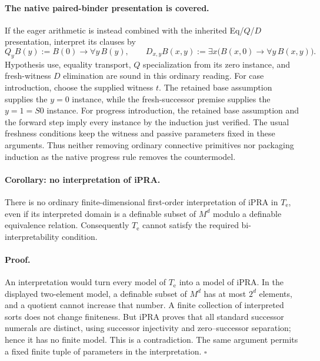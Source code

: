 \paragraph{The native paired-binder presentation is covered.}
If the eager arithmetic is instead combined with the inherited
Eq/$Q$/$D$ presentation, interpret its clauses by
\[
 Q_yB(y):=B(0)\to\forall y\,B(y),\qquad
 D_{x,y}B(x,y):=\exists x\bigl(B(x,0)\to\forall y\,B(x,y)\bigr).
\]
Hypothesis use, equality transport, $Q$ specialization from its zero
instance, and fresh-witness $D$ elimination are sound in this ordinary
reading.  For case introduction, choose the supplied witness $t$.
The retained base assumption supplies the $y=0$ instance, while the
fresh-successor premise supplies the $y=1=S0$ instance.  For progress
introduction, the retained base assumption and the forward step imply
every instance by the induction just verified.  The usual freshness
conditions keep the witness and passive parameters fixed in these
arguments.  Thus neither removing ordinary connective primitives nor
packaging induction as the native progress rule removes the countermodel.

\paragraph{Corollary: no interpretation of iPRA.}
There is no ordinary finite-dimensional first-order interpretation of
iPRA in $T_{\mathrm e}$, even if its interpreted domain is a definable
subset of $M^d$ modulo a definable equivalence relation.  Consequently
$T_{\mathrm e}$ cannot satisfy the required bi-interpretability condition.

\paragraph{Proof.}
An interpretation would turn every model of $T_{\mathrm e}$ into a model
of iPRA.  In the displayed two-element model, a definable subset of $M^d$
has at most $2^d$ elements, and a quotient cannot increase that number.
A finite collection of interpreted sorts does not change finiteness.
But iPRA proves that all standard successor numerals are distinct, using
successor injectivity and zero--successor separation; hence it has no
finite model.  This is a contradiction.  The same argument permits a
fixed finite tuple of parameters in the interpretation.
\hfill$\square$

